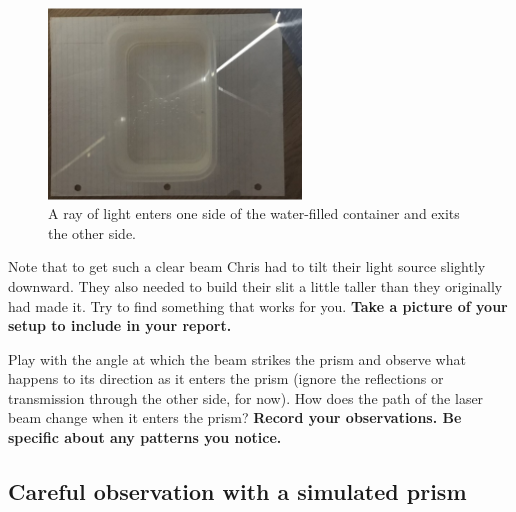 \begin{steps}
\begin{figure}
	\centering
	\includegraphics[width=0.6\textwidth]{lens-telescope/rectangle-refract.png}
	\caption{A ray of light enters one side of the water-filled container and exits the other side.}\label{lt:fig:rect}
\end{figure}

	Note that to get such a clear beam Chris had to tilt their light source slightly downward. They also needed to build their slit a little taller than they originally had made it. Try to find something that works for you. \textbf{Take a picture of your setup to include in your report.}

	\item Play with the angle at which the beam strikes the prism and observe what happens to its direction as it enters the prism (ignore the reflections or transmission through the other side, for now). How does the path of the laser beam change when it enters the prism? \textbf{Record your observations. Be specific about any patterns you notice.}

\end{steps}

\subsection{Careful observation with a simulated prism}

